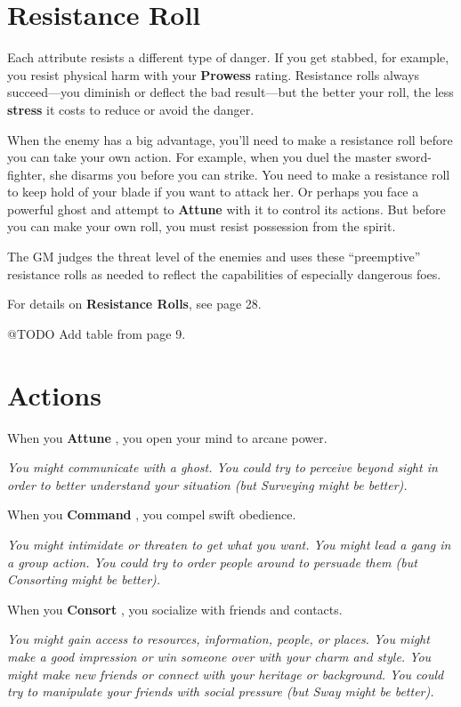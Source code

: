\documentclass[11pt,oneside]{book}
\newcommand{\gameterm}[1]{\textbf{#1}}
\begin{document}
\section{Resistance Roll}

Each attribute resists a different type of danger. If you get stabbed, for example, you resist physical harm with your \gameterm{Prowess}  rating. Resistance rolls always succeed---you diminish or deflect the bad result---but the better your roll, the less \textbf{stress} it costs to reduce or avoid the danger.

When the enemy has a big advantage, you’ll need to make a resistance roll before you can take your own action. For example, when you duel the master sword-fighter, she disarms you before you can strike. You need to make a resistance roll to keep hold of your blade if you want to attack her. Or perhaps you face a powerful ghost and attempt to \gameterm{Attune}  with it to control its actions. But before you can make your own roll, you must resist possession from the spirit.

The GM judges the threat level of the enemies and uses these “preemptive” resistance rolls as needed to reflect the capabilities of especially dangerous foes.

For details on \textbf{Resistance Rolls}, see page 28.

@TODO Add table from page 9.

\section{Actions}

When you \gameterm{Attune} , you open your mind to arcane power.

\emph{You might communicate with a ghost. You could try to perceive beyond sight in order to better understand your situation (but Surveying might be better).}

When you \gameterm{Command} , you compel swift obedience.

\emph{You might intimidate or threaten to get what you want. You might lead a gang in a group action. You could try to order people around to persuade them (but Consorting might be better).}

When you \gameterm{Consort} , you socialize with friends and contacts.

\emph{You might gain access to resources, information, people, or places. You might make a good impression or win someone over with your charm and style. You might make new friends or connect with your heritage or background. You could try to manipulate your friends with social pressure (but Sway might be better).}
\end{document}
